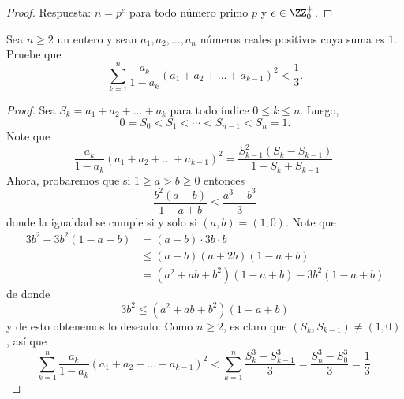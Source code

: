 \begin{proof}
	Respuesta: $n=p^e$ para todo número primo $p$ y $e\in\ZZ^+_0$.
\end{proof}

\begin{probHB}
	Sea $n\ge 2$ un entero y sean $a_1,a_2,\dots,a_n$ números reales positivos cuya suma es $1$. Pruebe que
	\[\sum_{k=1}^n\frac{a_k}{1-a_k}(a_1+a_2+\dots+a_{k-1})^2<\frac13.\]
\end{probHB}

\begin{proof}
	Sea $S_k=a_1+a_2+\dots+a_k$ para todo índice $0\le k\le n$. Luego,
	\[0=S_0<S_1<\cdots<S_{n-1}<S_n=1.\]
	Note que
	\[\frac{a_k}{1-a_k}(a_1+a_2+\dots+a_{k-1})^2=\frac{S_{k-1}^2(S_k-S_{k-1})}{1-S_k+S_{k-1}}.\]
	Ahora, probaremos que si $1\ge a>b\ge 0$ entonces
	\[\frac{b^2(a-b)}{1-a+b}\le\frac{a^3-b^3}{3}\]
	donde la igualdad se cumple si y solo si $(a,b)=(1,0)$. Note que
	\begin{align*}
		3b^2-3b^2(1-a+b)
		&=(a-b)\cdot 3b\cdot b\\
		&\le(a-b)(a+2b)(1-a+b)\\
		&=(a^2+ab+b^2)(1-a+b)-3b^2(1-a+b)
	\end{align*}
	de donde
	\[3b^2\le(a^2+ab+b^2)(1-a+b)\]
	y de esto obtenemos lo deseado. Como $n\ge 2$, es claro que $(S_k,S_{k-1})\ne(1,0)$, así que
	\[\sum_{k=1}^n\frac{a_k}{1-a_k}(a_1+a_2+\dots+a_{k-1})^2<\sum_{k=1}^n\frac{S_k^3-S_{k-1}^3}{3}=\frac{S_n^3-S_0^3}{3}=\frac13.\]
\end{proof}


